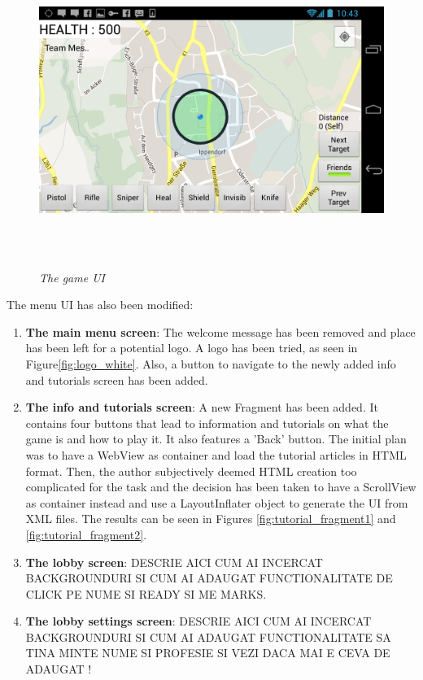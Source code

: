 \documentclass{article}
\begin{document}
\begin{figure}
\includegraphics[height=4in,width=7.12in]{./images/android_screenshots/second_development/game_second_development_5.png}
\caption{\small \sl The game UI \label{fig:game_ui2}}
\end{figure}

The menu UI has also been modified:
\begin{enumerate}
  \item \textbf{The main menu screen}: The welcome message has been removed and
  place has been left for a potential logo. A logo has been tried, as seen in
  Figure\ref{fig:logo_white}. Also, a button to navigate to the newly added info
  and tutorials screen has been added.
  
  \item \textbf{The info and tutorials screen}: A new Fragment has been added.
  It contains four buttons that lead to information and tutorials on what the
  game is and how to play it. It also features a 'Back' button. The initial plan
  was to have a WebView as container and load the tutorial articles in HTML
  format. Then, the author subjectively deemed HTML creation too complicated for
  the task and the decision has been taken to have a ScrollView as container
  instead and use a LayoutInflater object to generate the UI from XML files. The
  results can be seen in Figures \ref{fig:tutorial_fragment1} and
  \ref{fig:tutorial_fragment2}.
  
  \item \textbf{The lobby screen}: DESCRIE AICI CUM AI INCERCAT BACKGROUNDURI SI
  CUM AI ADAUGAT FUNCTIONALITATE DE CLICK PE NUME SI READY SI ME MARKS.
  
  \item \textbf{The lobby settings screen}: DESCRIE AICI CUM AI INCERCAT
  BACKGROUNDURI SI CUM AI ADAUGAT FUNCTIONALITATE SA TINA MINTE NUME SI PROFESIE
  SI VEZI DACA MAI E CEVA DE ADAUGAT !
  
\end{enumerate}
\end{document}
